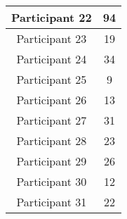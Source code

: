 \begin{table}[]
\begin{tabular}{|c|c|}
    Participant 22             & 94                                \\ \hline
    Participant 23             & 19                                \\ \hline
    Participant 24             & 34                                \\ \hline
    Participant 25             & 9                                \\ \hline
    Participant 26             & 13                                \\ \hline
    Participant 27             & 31                                \\ \hline
    Participant 28             & 23                                \\ \hline
    Participant 29             & 26                                \\ \hline
    Participant 30             & 12                                \\ \hline
    Participant 31             & 22                                  \\ \hline
    \end{tabular}
    \end{table}